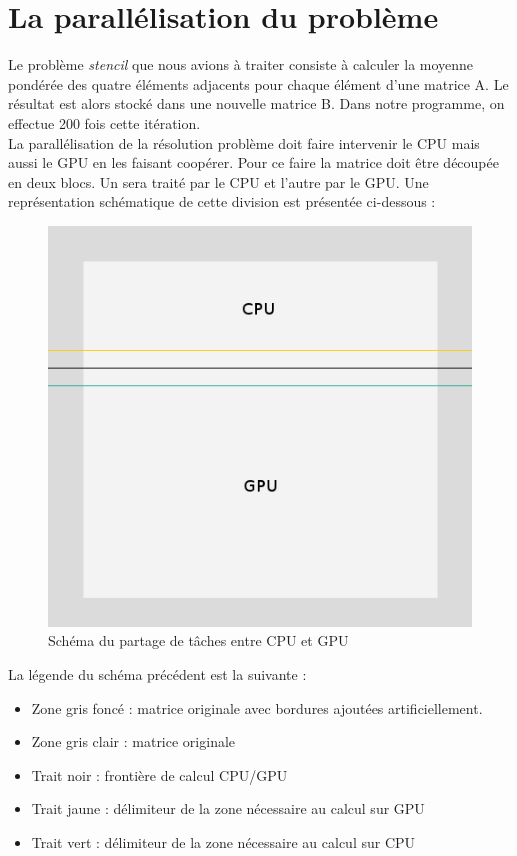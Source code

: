 \section{La parallélisation du problème}

	Le problème \textit{stencil} que nous avions à traiter consiste à calculer la moyenne pondérée des quatre éléments adjacents pour chaque élément d'une matrice A. Le résultat est alors stocké dans une nouvelle matrice B. Dans notre programme, on effectue 200 fois cette itération.\\
	
	La parallélisation de la résolution problème doit faire intervenir le CPU mais aussi le GPU en les faisant coopérer. Pour ce faire la matrice doit être découpée en deux blocs. Un sera traité par le CPU et l'autre par le GPU. Une représentation schématique de cette division est présentée ci-dessous : 
	
	\begin{figure}[H]
		\centering
		\includegraphics[scale=0.8]{schema.png}
		\caption{Schéma du partage de tâches entre CPU et GPU}
	\end{figure}
	
	
	La légende du schéma précédent est la suivante :
	
	\begin{itemize}
		\item Zone gris foncé : matrice originale avec bordures ajoutées artificiellement.
		\item Zone gris clair : matrice originale
		\item Trait noir : frontière de calcul CPU/GPU
		\item Trait jaune : délimiteur de la zone nécessaire au calcul sur GPU
		\item Trait vert  : délimiteur de la zone nécessaire au calcul sur CPU
	\end{itemize}
	

